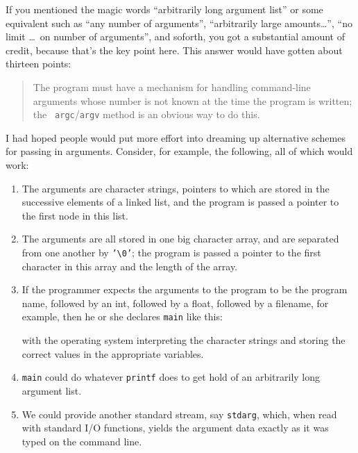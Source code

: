 If you mentioned the magic words ``arbitrarily long argument list'' or
some equivalent such as ``any number of arguments'', ``arbitrarily large
amounts\ldots'', ``no limit \ldots\ on number of arguments'', and soforth, you
got a substantial amount of credit, because that's the key point here.
This answer would have gotten about thirteen points:

\begin{quotation}
\small
The program must have a mechanism for handling command-line arguments
whose number is not known at the time the program is written; the {\tt
argc}/{\tt argv} method is an obvious way to do this.
\end{quotation}

I had hoped people would put more effort into dreaming up alternative
schemes for passing in arguments.  Consider, for example, the following,
all of which would work:

\begin{enumerate}
\item The arguments are character strings, pointers to which are stored
in the successive elements of a linked list, and the program is passed a
pointer to the first node in this list. \label{ll-args}
\item The arguments are all stored in one big character array, and are
separated from one another by {\tt '\verb+\+0'}; the program is passed a
pointer to the first character in this array and the length of the
array. \label{ca-args}
\item If the programmer expects the arguments to the program to be the
program name, followed by an int, followed by a float, followed by a
filename, for example, then he or she declares {\tt main} like this:
\begin{flushleft}
\verb% int main ( char *progname, int d, float f, char *filename)% 
\end{flushleft}
\noindent with the operating system interpreting the character strings
and storing the correct values in the appropriate variables. \label{np-args}
\item {\tt main} could do whatever {\tt printf} does to get hold of an
arbitrarily long argument list. \label{pf-args}
\item We could provide another standard stream, say {\tt stdarg}, which,
when read with standard I/O functions, yields the argument data exactly
as it was typed on the command line.\label{ss-args}
\end{enumerate}

